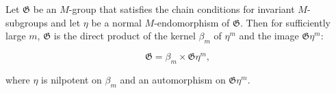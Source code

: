Let $\mathfrak{G}$ be an $M$-group that satisfies the chain conditions for invariant $M$-subgroups and let $\eta$ be a normal $M$-endomorphism of $\mathfrak{G}$. Then for sufficiently large $m$, $\mathfrak{G}$ is the direct product of the kernel $\beta_m$ of $\eta^m$ and the image $\mathfrak{G}\eta^m$:

$$\mathfrak{G} = \beta_m \times \mathfrak{G}\eta^m,$$

where $\eta$ is nilpotent on $\beta_m$ and an automorphism on $\mathfrak{G}\eta^m$.
